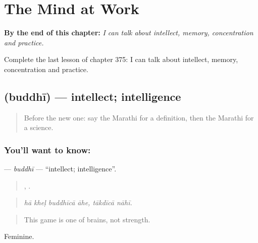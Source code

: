 
\chapter{The Mind at Work}
\label{ch:mr-the-mind-at-work}

\begin{chapteropening}
\textbf{By the end of this chapter:} \emph{I can talk about intellect, memory, concentration and practice.}

Complete the last lesson of chapter 375: I can talk about intellect, memory, concentration and practice.
\end{chapteropening}

\section[\texorpdfstring{\mr{बुद्धी} (buddhī)}{बुद्धी (buddhī)}]{ (buddhī) — intellect; intelligence}

\label{lesson:MR-C375-buddhi}



\begin{quote}
Before the new one: say the Marathi for a definition, then the Marathi for a science.
\end{quote}

\subsection*{You'll want to know: }
\textbf{} — \emph{buddhī} — \textquotedblleft{}intellect; intelligence\textquotedblright{}.

\begin{quote}
   ,  .
\end{quote}

\begin{quote}
\emph{hā kheḷ buddhīcā āhe, tākdīcā nāhī.}
\end{quote}

\begin{quote}
This game is one of brains, not strength.
\end{quote}

Feminine.

